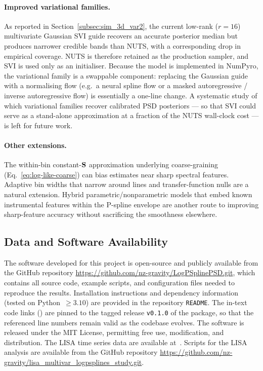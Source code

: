 \documentclass[%
	reprint,
	nofootinbib,
	amsmath,
	amssymb,
	aps,
]{revtex4-2}
\renewcommand{\S}{{\bf S}}
\begin{document}
	\paragraph{Improved variational families.}
	As reported in Section~\ref{subsec:sim_3d_var2}, the current low-rank
	($r=16$) multivariate Gaussian SVI guide recovers an accurate
	posterior median but produces narrower credible bands than NUTS,
	with a corresponding drop in empirical coverage. NUTS is therefore
	retained as the production sampler, and SVI is used only as an
	initialiser. Because the model is implemented in NumPyro, the
	variational family is a swappable component: replacing the Gaussian
	guide with a normalising flow (e.g.\ a neural spline flow or a
	masked autoregressive / inverse autoregressive flow) is essentially
	a one-line change. A systematic study of which variational families
	recover calibrated PSD posteriors --- so that SVI could serve as a
	stand-alone approximation at a fraction of the NUTS wall-clock cost
	--- is left for future work.

	\paragraph{Other extensions.}
	The within-bin constant-$\S$ approximation underlying coarse-graining
	(Eq.~\ref{eq:log-like-coarse}) can bias estimates near sharp
	spectral features. Adaptive bin widths that narrow around lines and
	transfer-function nulls are a natural extension. Hybrid
	parametric/nonparametric models that embed known instrumental
	features within the P-spline envelope are another route to improving
	sharp-feature accuracy without sacrificing the smoothness elsewhere.




	\subsection*{Data and Software Availability}
	The software developed for this project is open-source and publicly available from the GitHub repository
	\url{https://github.com/nz-gravity/LogPSplinePSD.git}, which contains all source code, example scripts,
	and configuration files needed to reproduce the results.
	Installation instructions and dependency information (tested on Python~$\geq 3.10$) are provided in the repository \texttt{README}.
	The in-text code links (\scalebox{0.65}{\GitHubIcon}) are pinned to the tagged release \texttt{v0.1.0} of the package, so that the referenced line numbers remain valid as the codebase evolves.
	The software is released under the MIT License, permitting free use, modification, and distribution.
	The LISA time series data are available at~\citep{lisa_noise4a, lisa_noise5a}.
    Scripts for the LISA analysis are available from the GitHub repository
	\url{https://github.com/nz-gravity/lisa_multivar_logpsplines_study.git}.
\end{document}
